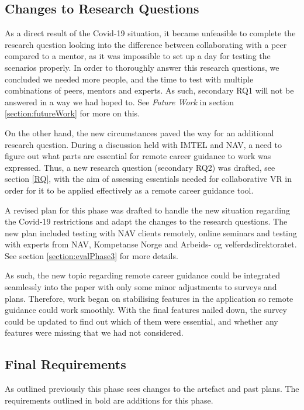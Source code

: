 \subsection{Changes to Research Questions}
As a direct result of the Covid-19 situation, it became unfeasible to complete the research question looking into the difference between collaborating with a peer compared to a mentor, as it was impossible to set up a day for testing the scenarios properly. In order to thoroughly answer this research questions, we concluded we needed more people, and the time to test with multiple combinations of peers, mentors and experts. As such, secondary RQ1 will not be answered in a way we had hoped to. See \textit{Future Work} in section \ref{section:futureWork} for more on this.

On the other hand, the new circumstances paved the way for an additional research question. During a discussion held with IMTEL and NAV, a need to figure out what parts are essential for remote career guidance to work was expressed.  Thus, a new research question (secondary RQ2) was drafted, see section \ref{RQ}, with the aim of assessing essentials needed for collaborative VR in order for it to be applied effectively as a remote career guidance tool. 

A revised plan for this phase was drafted to handle the new situation regarding the Covid-19 restrictions and adapt the changes to the research questions. The new plan included testing with NAV clients remotely, online seminars and testing with experts from NAV, Kompetanse Norge and Arbeids- og velferdsdirektoratet. See section \ref{section:evalPhase3} for more details.    

As such, the new topic regarding remote career guidance could be integrated seamlessly into the paper with only some minor adjustments to surveys and plans. Therefore, work began on stabilising features in the application so remote guidance could work smoothly. With the final features nailed down, the survey could be updated to find out which of them were essential, and whether any features were missing that we had not considered.


\subsection{Final Requirements}
As outlined previously this phase sees changes to the artefact and past plans. The requirements outlined in bold are additions for this phase.

